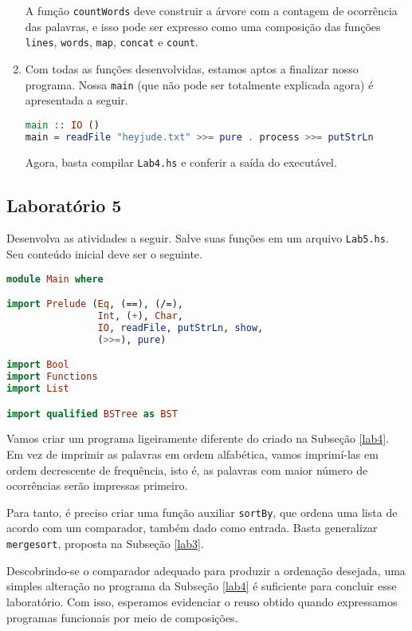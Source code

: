 \documentclass[a4paper]{article}
\begin{document}
\begin{enumerate}
		A função \texttt{countWords} deve construir a árvore com a contagem de ocorrência das palavras, e isso pode ser expresso como uma composição das funções \texttt{lines}, \texttt{words}, \texttt{map}, \texttt{concat} e \texttt{count}.
	\item
		Com todas as funções desenvolvidas, estamos aptos a finalizar nosso programa.
		Nossa \texttt{main} (que não pode ser totalmente explicada agora) é apresentada a seguir.
		\begin{lstlisting}[language=haskell, frame=single]
main :: IO ()
main = readFile "heyjude.txt" >>= pure . process >>= putStrLn
		\end{lstlisting}
		Agora, basta compilar \texttt{Lab4.hs} e conferir a saída do executável.
\end{enumerate}

\subsection{Laboratório 5}

Desenvolva as atividades a seguir.
Salve suas funções em um arquivo \texttt{Lab5.hs}.
Seu conteúdo inicial deve ser o seguinte.

\pagebreak

\begin{lstlisting}[language=haskell, frame=single]
module Main where

import Prelude (Eq, (==), (/=),
                Int, (+), Char,
                IO, readFile, putStrLn, show,
                (>>=), pure)

import Bool
import Functions
import List

import qualified BSTree as BST
\end{lstlisting}

Vamos criar um programa ligeiramente diferente do criado na Subseção \ref{lab4}.
Em vez de imprimir as palavras em ordem alfabética, vamos imprimí-las em ordem decrescente de frequência, isto é, as palavras com maior número de ocorrências serão impressas primeiro.

Para tanto, é preciso criar uma função auxiliar \texttt{sortBy}, que ordena uma lista de acordo com um comparador, também dado como entrada.
Basta generalizar \texttt{mergesort}, proposta na Subseção \ref{lab3}.

Descobrindo-se o comparador adequado para produzir a ordenação desejada, uma simples alteração no programa da Subseção \ref{lab4} é suficiente para concluir esse laboratório.
Com isso, esperamos evidenciar o reuso obtido quando expressamos programas funcionais por meio de composições.
\end{document}
